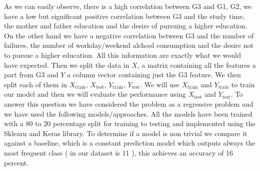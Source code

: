 \documentclass[a4paper, 11pt]{report}
\theoremstyle{definition}
\numberwithin{equation}{section}		%
\numberwithin{figure}{section}			%
\numberwithin{table}{section}				%
\begin{document}
As we can easily observe, there is a high correlation between G3 and G1, G2, we have a low but significant positive correlation between G3 and the study time, the mother and father education and the desire of pursuing a higher education. On the other hand we have a negative correlation between G3 and the number of failures, the number of workday/weekend alchool consumption and the desire not to pursue a higher education. All this information are exactly what we would have expected. Then we split the data in $X$, a matrix containing all the features a part from G3 and $Y$ a column vector containing just the G3 feature. We then split each of them in $X_{\text{train}}$, $X_{\text{test}}$, $Y_{\text{train}}$, $Y_{\text{test}}$. We will use $X_{\text{train}}$ and $Y_{\text{train}}$ to train our model and then we will evaluate the performance using $X_{\text{test}}$ and $Y_{\text{test}}$. To answer this question we have considered the problem as a regressive problem and we have used the following models/approaches. All the models have been trained with a 80 to 20 percentage split for training to testing and implemented using the Sklearn and Keras library. To determine if a model is non trivial we compare it against a baseline, which is a constant prediction model which outputs always the most frequent class ( in our dataset is 11 ), this achieves an accuracy of 16 percent.
\end{document}
